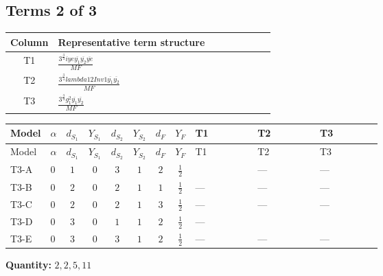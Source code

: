 \documentclass[8pt]{article}
\begin{document}
\begin{landscape}
\subsection*{Terms 2 of 3}
\begin{center}
\begin{tabular}{@{}c >{\raggedright\arraybackslash}p{0.82\linewidth}@{}}
\toprule
Column & Representative term structure \\
\midrule
T1 & \(\displaystyle \frac{3^{\frac{3}{4}} i ye \overline{y_{1}} \overline{y_{2}} \overline{ye}}{MF}\) \\
\midrule
T2 & \(\displaystyle \frac{3^{\frac{3}{4}} lambda12Inv1 \overline{y_{1}} \overline{y_{2}}}{MF}\) \\
\midrule
T3 & \(\displaystyle \frac{3^{\frac{3}{4}} g_{1}^{2} \overline{y_{1}} \overline{y_{2}}}{MF}\) \\
\midrule
\bottomrule
\end{tabular}
\end{center}
\smallskip
\tiny
\begin{longtable}{@{}llcccccc >{\raggedright\arraybackslash}p{0.21\linewidth} >{\raggedright\arraybackslash}p{0.21\linewidth} >{\raggedright\arraybackslash}p{0.21\linewidth}@{}}
\toprule
Model & $\alpha$ & $d_{S_1}$ & $Y_{S_1}$ & $d_{S_2}$ & $Y_{S_2}$ & $d_F$ & $Y_F$ & T1 & T2 & T3 \\
\midrule
\endfirsthead
\toprule
Model & $\alpha$ & $d_{S_1}$ & $Y_{S_1}$ & $d_{S_2}$ & $Y_{S_2}$ & $d_F$ & $Y_F$ & T1 & T2 & T3 \\
\midrule
\endhead
T3-A & $0$ & $1$ & $0$ & $3$ & $1$ & $2$ & $\frac{1}{2}$ & \scriptsize\adjustbox{max width=\linewidth}{$\begin{gathered} \frac{3^{\frac{3}{4}} i ye \overline{y_{1}} \overline{y_{2}} \overline{ye}}{12 MF}\end{gathered}$} & --- & --- \\
\midrule
T3-B & $0$ & $2$ & $0$ & $2$ & $1$ & $1$ & $\frac{1}{2}$ & --- & --- & --- \\
\midrule
T3-C & $0$ & $2$ & $0$ & $2$ & $1$ & $3$ & $\frac{1}{2}$ & --- & --- & --- \\
\midrule
T3-D & $0$ & $3$ & $0$ & $1$ & $1$ & $2$ & $\frac{1}{2}$ & --- & \scriptsize\adjustbox{max width=\linewidth}{$\begin{gathered} \frac{3^{\frac{3}{4}} lambda12Inv1 \overline{y_{1}} \overline{y_{2}}}{6 MF}\end{gathered}$} & \scriptsize\adjustbox{max width=\linewidth}{$\begin{gathered} \frac{3^{\frac{3}{4}} g_{1}^{2} \overline{y_{1}} \overline{y_{2}}}{8 MF}\end{gathered}$} \\
\midrule
T3-E & $0$ & $3$ & $0$ & $3$ & $1$ & $2$ & $\frac{1}{2}$ & --- & --- & --- \\
\midrule
\bottomrule
\end{longtable}
\clearpage
\noindent\textbf{Quantity: }$\mathrm{2,2,5,11}$\par\smallskip

\end{landscape}
\end{document}
